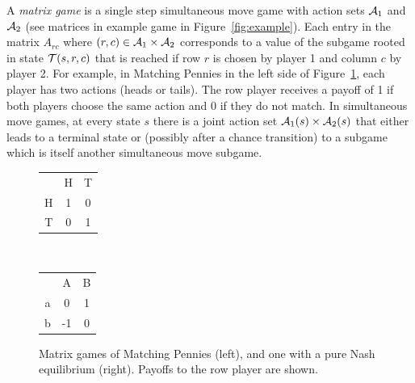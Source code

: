 A {\it matrix game} is a single step simultaneous move game with action sets $\mathcal{A}_1$ and $\mathcal{A}_2$ (see matrices in example game in Figure~\ref{fig:example}).
Each entry in the matrix $A_{rc}$ where $(r,c) \in \mathcal{A}_1 \times \mathcal{A}_2$ corresponds to a value of the subgame rooted in state $\mathcal{T}(s,r,c)$ that is reached if row $r$ is chosen by player 1 and column $c$ by player 2.
For example, in Matching Pennies in the left side of Figure~\ref{fig:egMatrixGames}, each player has two actions (heads or tails).
The row player receives a payoff of 1
if both players choose the same action and 0 if they do not match.
In simultaneous move games, at every state $s$ there is a joint action set $\mathcal{A}_1(s) \times \mathcal{A}_2(s)$ that either leads to a terminal state or (possibly after a
chance transition) to a subgame which is itself another simultaneous move subgame.

\begin{figure}[t!]
\centering
\begin{tabular}{c|c|c|}
 \multicolumn{1}{c}{~} & \multicolumn{1}{c}{H}  &  \multicolumn{1}{c}{T}\\\cline{2-3}
H &  1  &  0\\\cline{2-3}
T  & 0  &  1\\\cline{2-3}
\end{tabular}
~~~~~~~~~
\begin{tabular}{c|c|c|}
 \multicolumn{1}{c}{~} & \multicolumn{1}{c}{A}  &  \multicolumn{1}{c}{B}\\\cline{2-3}
a &  0  &  1\\\cline{2-3}
b & -1  &  0\\\cline{2-3}
\end{tabular}
\caption{Matrix games of Matching Pennies (left), and one with a pure Nash equilibrium (right).
Payoffs to the row player are shown. \label{fig:egMatrixGames}}
\end{figure}


